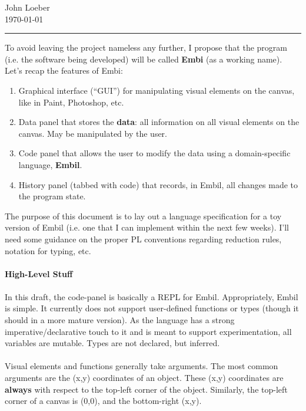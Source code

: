 \documentclass[12pt]{article}
\theoremstyle{remark}
\begin{document}
\hfill John Loeber\\
 \hfill \today
\vspace{1.2pt}
\hrule
\vspace*{1.8mm}
$$$$
\noindent 
To avoid leaving the project nameless any further, I propose that the program (i.e. the software being developed) will be called \textbf{Embi} (as a working name). Let's recap the features of Embi:
\begin{enumerate}
\item Graphical interface (``GUI'') for manipulating visual elements on the canvas, like in Paint, Photoshop, etc.
\item Data panel that stores the \textbf{data}: all information on all visual elements on the canvas. May be manipulated by the user.
\item Code panel that allows the user to modify the data using a domain-specific language, \textbf{Embil}.
\item History panel (tabbed with code) that records, in Embil, all changes made to the program state.
\end{enumerate}

\noindent
The purpose of this document is to lay out a language specification for a toy version of Embil (i.e. one that I can implement within the next few weeks). I'll need some guidance on the proper PL conventions regarding reduction rules, notation for typing, etc.
\\\\
\textbf{High-Level Stuff}
\\\\
In this draft, the code-panel is basically a REPL for Embil. Appropriately, Embil is simple. It currently does not support user-defined functions or types (though it should in a more mature version). As the language has a strong imperative/declarative touch to it and is meant to support experimentation, all variables are mutable. Types are not declared, but inferred. 
\\\\
Visual elements and functions generally take arguments. The most common arguments are the (x,y) coordinates of an object. These (x,y) coordinates are \textbf{always} with respect to the top-left corner of the object. Similarly, the top-left corner of a canvas is (0,0), and the bottom-right (x,y).
\end{document}
